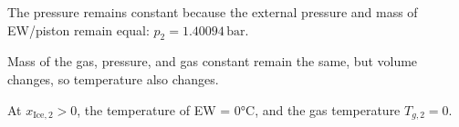The pressure remains constant because the external pressure and mass of EW/piston remain equal:  
\( p_2 = 1.40094 \, \text{bar} \).  

Mass of the gas, pressure, and gas constant remain the same, but volume changes, so temperature also changes.  

At \( x_{\text{Ice},2} > 0 \), the temperature of EW = 0°C, and the gas temperature \( T_{g,2} = 0 \).